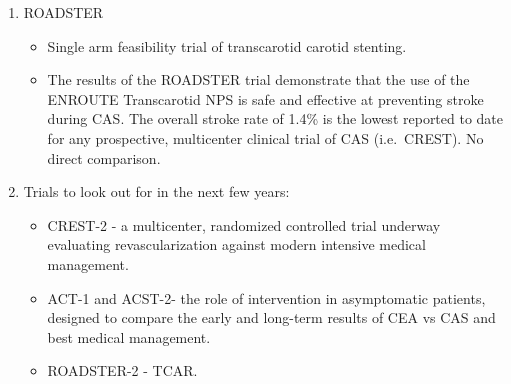 \documentclass[
]{book}
\providecommand{\tightlist}{%
  \setlength{\itemsep}{0pt}\setlength{\parskip}{0pt}}
\begin{document}
\begin{enumerate}
  \begin{itemize}
  \item
    Compared CEA vs.~CAS in both symptomatic and asymptomatic
    patients.
  \item
    Composite endpoint of 30-day stroke, MI, death equivalent
    between CEA and CAS.
  \item
    CAS had a significantly higher incidence of stroke and death
    than CEA and CEA higher incidence of MI.

    \begin{itemize}
    \tightlist
    \item
      Follow up at 10 years demonstrated no difference in
      composite stroke/MI/death but increased rate of stroke/death
      in stented patients likely attributable to increased
      periprocedural stroke. \citep{brottLongTermResultsStenting2016b}
    \item
      CAS patients with stroke had a higher impact on QOL than CEA
      patients with MI.\citep{brott2010, redfern2011, mantese2010}
    \end{itemize}
  \item
    Subanalyses identified that older patients (\textgreater70y) had better
    outcomes after CEA than CAS, the QOL impact of stroke was more
    significant than that of MI, and anatomic characteristics of
    carotid lesions (longer, sequential, remote) were predictive of
    increased stroke and death after CAS.
  \item
    Unfortunately, this study provides a benchmark to strive for,
    but no other large trials have achieved these results.
  \end{itemize}
\item
  ROADSTER\citep{kwolek2015}

  \begin{itemize}
  \item
    Single arm feasibility trial of transcarotid carotid stenting.
  \item
    The results of the ROADSTER trial demonstrate that the use of
    the ENROUTE Transcarotid NPS is safe and effective at preventing
    stroke during CAS. The overall stroke rate of 1.4\% is the lowest
    reported to date for any prospective, multicenter clinical trial
    of CAS (i.e.~CREST). No direct comparison.
  \end{itemize}
\item
  Trials to look out for in the next few years:

  \begin{itemize}
  \item
    CREST-2 - a multicenter, randomized controlled trial underway
    evaluating revascularization against modern intensive medical
    management.
  \item
    ACT-1 and ACST-2- the role of intervention in asymptomatic
    patients, designed to compare the early and long-term results of
    CEA vs CAS and best medical management.
  \item
    ROADSTER-2 - TCAR.
  \end{itemize}
\end{enumerate}
\end{document}
